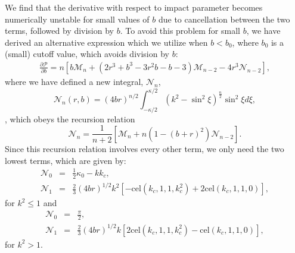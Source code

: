 \documentclass[modern]{aastex61}
\begin{document}
We find that the derivative with respect to impact parameter becomes numerically
unstable for small values of $b$ due to cancellation between the two
terms, followed by division by $b$.  To avoid this problem
for small $b$, we have derived an alternative expression which we utilize when
$b < b_0$, where $b_0$ is a (small) cutoff value, which avoids division by $b$:
\begin{eqnarray}
\frac{\partial \mathcal{P}}{\partial b} = n \left[b\mathcal{M}_n +(2r^3+b^3-3r^2b-b-3) \mathcal{M}_{n-2}-4r^3\mathcal{N}_{n-2}\right],
\end{eqnarray}
where we have defined a new integral, $\mathcal{N}_n$,
\begin{equation}
\mathcal{N}_n(r,b) = (4br)^{n/2} \int_{-\kappa/2}^{\kappa/2} (k^2-\sin^2\xi)^{\tfrac{n}{2}} \sin^2{\xi} d\xi,
\end{equation}
, which obeys the recursion relation
\begin{equation}
\mathcal{N}_n = \frac{1}{n+2} \left[\mathcal{M}_n + n(1-(b+r)^2) \mathcal{N}_{n-2}\right].
\end{equation}
Since this recursion relation involves every other term, we only need the two lowest terms,
which are given by:
\begin{eqnarray}
\mathcal{N}_0 &=& \tfrac{1}{2}\kappa_0 - k k_c,\\
\mathcal{N}_1 &=& \tfrac{2}{3}(4br)^{1/2} k^2 \left[-\mathrm{cel}(k_c,1,1,k_c^2) + 2 \mathrm{cel}(k_c,1,1,0)\right],
\end{eqnarray}
for $k^2 \le 1$ and
\begin{eqnarray}
\mathcal{N}_0 &=& \frac{\pi}{2},\\
\mathcal{N}_1 &=&  \tfrac{2}{3}(4br)^{1/2} k \left[2\mathrm{cel}(k_c,1,1,k_c^2) - \mathrm{cel}(k_c,1,1,0)\right],
\end{eqnarray}
for $k^2 > 1$.
\end{document}

